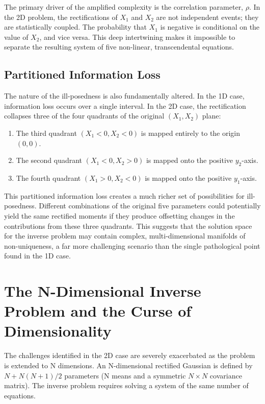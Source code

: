 The primary driver of the amplified complexity is the correlation parameter, $\rho$. In the 2D problem, the rectifications of $X_1$ and $X_2$ are not independent events; they are statistically coupled. The probability that $X_1$ is negative is conditional on the value of $X_2$, and vice versa. This deep intertwining makes it impossible to separate the resulting system of five non-linear, transcendental equations.

\subsection{Partitioned Information Loss}
The nature of the ill-posedness is also fundamentally altered. In the 1D case, information loss occurs over a single interval. In the 2D case, the rectification collapses three of the four quadrants of the original $(X_1, X_2)$ plane:
\begin{enumerate}
    \item The third quadrant $(X_1 < 0, X_2 < 0)$ is mapped entirely to the origin $(0,0)$.
    \item The second quadrant $(X_1 < 0, X_2 > 0)$ is mapped onto the positive $y_2$-axis.
    \item The fourth quadrant $(X_1 > 0, X_2 < 0)$ is mapped onto the positive $y_1$-axis.
\end{enumerate}
This partitioned information loss creates a much richer set of possibilities for ill-posedness. Different combinations of the original five parameters could potentially yield the same rectified moments if they produce offsetting changes in the contributions from these three quadrants. This suggests that the solution space for the inverse problem may contain complex, multi-dimensional manifolds of non-uniqueness, a far more challenging scenario than the single pathological point found in the 1D case.

\section{The N-Dimensional Inverse Problem and the Curse of Dimensionality}
\label{sec:inverse_nd}

The challenges identified in the 2D case are severely exacerbated as the problem is extended to N dimensions. An N-dimensional rectified Gaussian is defined by $N + N(N+1)/2$ parameters (N means and a symmetric $N \times N$ covariance matrix). The inverse problem requires solving a system of the same number of equations.

